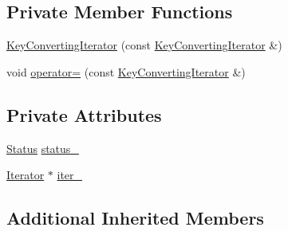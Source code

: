 \subsection*{Private Member Functions}
\begin{DoxyCompactItemize}
\item 
\hyperlink{classleveldb_1_1_key_converting_iterator_a33bd543eacf7dc1a9820c0c8e47d8786}{Key\-Converting\-Iterator} (const \hyperlink{classleveldb_1_1_key_converting_iterator}{Key\-Converting\-Iterator} \&)
\item 
void \hyperlink{classleveldb_1_1_key_converting_iterator_a33c88b1339f4ea2e21517c3ef87d3fa9}{operator=} (const \hyperlink{classleveldb_1_1_key_converting_iterator}{Key\-Converting\-Iterator} \&)
\end{DoxyCompactItemize}
\subsection*{Private Attributes}
\begin{DoxyCompactItemize}
\item 
\hyperlink{classleveldb_1_1_status}{Status} \hyperlink{classleveldb_1_1_key_converting_iterator_a0d1a57e8266f4f10b1ad730a98c39836}{status\-\_\-}
\item 
\hyperlink{classleveldb_1_1_iterator}{Iterator} $\ast$ \hyperlink{classleveldb_1_1_key_converting_iterator_a1aabeddf10287809ee449cbbe1422956}{iter\-\_\-}
\end{DoxyCompactItemize}
\subsection*{Additional Inherited Members}


